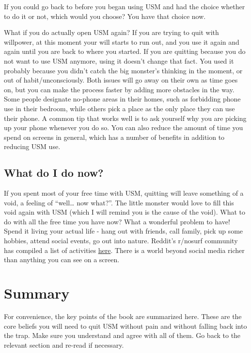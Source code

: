 \documentclass[
  openany]{book}
\begin{document}
If you could go back to before you began using USM and had the choice whether to do it or not, which would you choose? You have that choice now.

What if you do actually open USM again? If you are trying to quit with willpower, at this moment your will starts to run out, and you use it again and again until you are back to where you started. If you are quitting because you do not want to use USM anymore, using it doesn't change that fact. You used it probably because you didn't catch the big monster's thinking in the moment, or out of habit/unconsciously. Both issues will go away on their own as time goes on, but you can make the process faster by adding more obstacles in the way. Some people designate no-phone areas in their homes, such as forbidding phone use in their bedroom, while others pick a place as the only place they can use their phone. A common tip that works well is to ask yourself why you are picking up your phone whenever you do so. You can also reduce the amount of time you spend on screens in general, which has a number of benefits in addition to reducing USM use.

\section{What do I do now?}\label{what-do-i-do-now}

If you spent most of your free time with USM, quitting will leave something of a void, a feeling of ``well\ldots{} now what?''. The little monster would love to fill this void again with USM (which I will remind you is the cause of the void). What to do with all the free time you have now? What a wonderful problem to have! Spend it living your actual life - hang out with friends, call family, pick up some hobbies, attend social events, go out into nature. Reddit's r/nosurf community has compiled a list of activities \href{https://www.reddit.com/r/nosurf/wiki/activities/}{here}. There is a world beyond social media richer than anything you can see on a screen.

\chapter{Summary}\label{summary}

For convenience, the key points of the book are summarized here. These are the core beliefs you will need to quit USM without pain and without falling back into the trap. Make sure you understand and agree with all of them. Go back to the relevant section and re-read if necessary.
\end{document}
